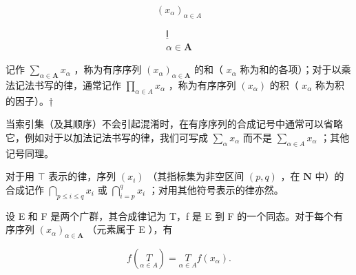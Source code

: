 \[
\left(x _ {\alpha}\right) _ {\alpha \in A}
\]

\[
\begin{array}{c} \underline {{\mathsf {I}}} \\ \alpha \in \mathbf {A} \end{array}
\]

记作 \(\sum_{\alpha \in \mathbf{A}} x_{\alpha}\) ，称为有序序列 \((x_{\alpha})_{\alpha \in \mathbf{A}}\) 的和（ \(x_{\alpha}\) 称为和的各项）；对于以乘法记法书写的律，通常记作 \(\prod_{\alpha \in A} x_{\alpha}\) ，称为有序序列 \((x_{\alpha})\) 的积（ \(x_{\alpha}\) 称为积的因子）。†

当索引集（及其顺序）不会引起混淆时，在有序序列的合成记号中通常可以省略它，例如对于以加法记法书写的律，我们可写成 \(\sum_{\alpha} x_{\alpha}\) 而不是 \(\sum_{\alpha \in A} x_{\alpha}\) ；其他记号同理。

对于用 \(\top\) 表示的律，序列 \((x_{i})\) （其指标集为非空区间 \((p,q)\) ，在 \(\mathbf{N}\) 中）的合成记作 \(\bigcap_{p\leqslant i\leqslant q}x_{i}\) 或 \(\bigcap_{i = p}^{q}x_{i}\) ；对用其他符号表示的律亦然。

设 E 和 F 是两个广群，其合成律记为 T，f 是 E 到 F 的一个同态。对于每个有序序列 \((x_{\alpha})_{\alpha \in \mathbf{A}}\) （元素属于 E ），有

\[
f \left(\underset {\alpha \in A} {T}\right) = \underset {\alpha \in A} {T} f (x _ {\alpha}).\tag{2}
\]

